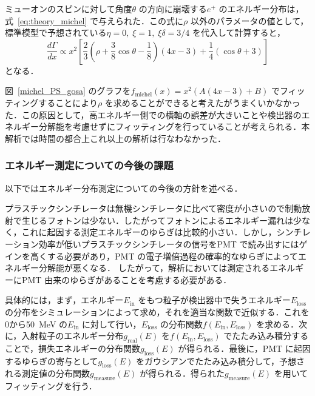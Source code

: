 ミューオンのスピンに対して角度$\theta$ の方向に崩壊する$e^{+}$ のエネルギー分布は，式~\eqref{eq:theory_michel} で与えられた．この式に$\rho$ 以外のパラメータの値として，標準模型で予想されている$\eta = 0 , \;\xi = 1 , \;\xi \delta = 3/4$ を代入して計算すると，
\[\frac{d\Gamma}{dx} \propto x^{2} [\frac{2}{3}(\rho + \frac{3}{8}\cos \theta - \frac{1}{8})(4x-3) + \frac{1}{4}(\cos \theta + 3)]\]
となる．

図~\ref{michel_PS_gosa} のグラフを$f_{\mathrm{michel}}(x) = x^{2} (A(4x -3) + B)$ でフィッティングすることにより$\rho$ を求めることができると考えたがうまくいかなかった．この原因として，高エネルギー側での横軸の誤差が大きいことや検出器のエネルギー分解能を考慮せずにフィッティングを行っていることが考えられる．本解析では時間の都合上これ以上の解析は行なわなかった．

\subsubsection{エネルギー測定についての今後の課題}
以下ではエネルギー分布測定についての今後の方針を述べる．

プラスチックシンチレータは無機シンチレータに比べて密度が小さいので制動放射で生じるフォトンは少ない．したがってフォトンによるエネルギー漏れは少なく，これに起因する測定エネルギーのゆらぎは比較的小さい．しかし，シンチレーション効率が低いプラスチックシンチレータの信号をPMT で読み出すにはゲインを高くする必要があり，PMT の電子増倍過程の確率的なゆらぎによってエネルギー分解能が悪くなる．
したがって，解析においては測定されるエネルギーにPMT 由来のゆらぎがあることを考慮する必要がある．

具体的には，まず，エネルギー$E_\mathrm{in}$ をもつ粒子が検出器中で失うエネルギー$E_\mathrm{loss}$ の分布をシミュレーションによって求め，それを適当な関数で近似する．これを0から50~MeV の$E_\mathrm{in}$ に対して行い，$E_\mathrm{loss}$ の分布関数$f(E_\mathrm{in}, E_\mathrm{loss})$ を求める．次に，入射粒子のエネルギー分布$g_{\mathrm{real}}(E)$ を$f(E_\mathrm{in}, E_\mathrm{loss})$ でたたみ込み積分することで，損失エネルギーの分布関数$g_{\mathrm{loss}}(E)$ が得られる．最後に，PMT に起因するゆらぎの寄与として$g_{\mathrm{loss}}(E)$ をガウシアンでたたみ込み積分して，予想される測定値の分布関数$g_{\mathrm{measure}}(E)$ が得られる．得られた$g_{\mathrm{measure}}(E)$ を用いてフィッティングを行う．
  
